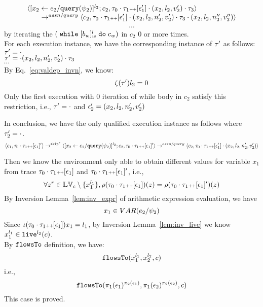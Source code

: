 \begin{subproof}
\begin{subproof}[Subproof]
\begin{enumerate}
\[\begin{array}{l}
  \langle [\mathrel{ {x}_2 \leftarrow e_2 / {\tt query}(\psi_2) }]^{l_2} ; {c}_2, 
  \mathtt{\tau}_0 \cdot \mathtt{\tau}_1 {\scriptscriptstyle ++} [\mathtt{\epsilon}_1']\cdot (x_2, l_2, v_2') \cdot \mathtt{\tau}_3 \rangle 
  \\ \qquad
  \rightarrow^{assn/query} 
  \langle {c}_2,  \mathtt{\tau}_0 \cdot \mathtt{\tau}_1 {\scriptscriptstyle ++} [\mathtt{\epsilon}_1']\cdot (x_2, l_2, n_2', v_2') \cdot \mathtt{\tau}_3 \cdot (x_2, l_2, n_2'', v_2'') \rangle 
 \end{array}
 \]
\[
  \cdots
\] 
by iterating the $(\;\mathtt{while}\; [b_w]^l_w \;\mathtt{do}\; c_w)$ in $c_2$ $0$ or more times.
%
\\
%
For each execution instance, we have the corresponding instance of $\mathtt{\tau}'$ as follows:
\\
$\mathtt{\tau}'  = \cdot$
\\
$\mathtt{\tau}' = \cdot (x_2, l_2, n_2', v_2') \cdot \mathtt{\tau}_3 $
%
\\
$\cdots$
%
\\
%
By Eq.~\ref{eq:valdep_invn}, we know:
%
\[
 \mathtt{\zeta}(\mathtt{\tau}') l_2 = 0
\]
%
Only the first execution with 0 iteration of while body in $c_2$ satisfy this restriction, i.e., $\mathtt{\tau}' = \cdot$ and $\mathtt{\epsilon}_2' = (x_2, l_2, n_2', v_2')$
%
\end{enumerate}
In conclusion, we have the only qualified execution instance as follows where $\mathtt{\tau}_2' = \cdot$.
  \[
  \langle c_1, \mathtt{\tau}_0 \cdot \mathtt{\tau}_1 {\scriptscriptstyle ++} [\mathtt{\epsilon}_1]' \rangle 
  \rightarrow^{\mathtt{skip}^*} 
  \langle [\mathrel{ {x}_2 \leftarrow e_2 / {\tt query}(\psi_2) }]^{l_2} ; {c}_2, \mathtt{\tau}_0 \cdot \mathtt{\tau}_1 {\scriptscriptstyle ++} [\mathtt{\epsilon}_1]' \rangle 
  \rightarrow^{assn/query} 
  \langle {c}_2,  \mathtt{\tau}_0 \cdot \mathtt{\tau}_1 {\scriptscriptstyle ++} [\mathtt{\epsilon}_1']\cdot (x_2, l_2, n_2', v_2') \rangle 
 \]
\end{subproof}
%
Then we know the environment only able to obtain different values for variable $x_1$ 
from trace $\mathtt{\tau}_0 \cdot \mathtt{\tau}_1 {\scriptscriptstyle ++} [\mathtt{\epsilon}_1]$ and 
$\mathtt{\tau}_0 \cdot \mathtt{\tau}_1 {\scriptscriptstyle ++} [\mathtt{\epsilon}_1]'$, i.e.,
\[
  \forall z^r \in \mathbb{LV}_c \setminus \{x_1^{l_1}\} ,
  \rho(\mathtt{\tau}_0 \cdot \mathtt{\tau}_1 {\scriptscriptstyle ++} [\mathtt{\epsilon}_1]) (z) =  
  \rho(\mathtt{\tau}_0 \cdot \mathtt{\tau}_1 {\scriptscriptstyle ++} [\mathtt{\epsilon}_1]') (z)
\]
%
By {Inversion Lemma~\ref{lem:inv_expr}} of arithmetic expression evaluation, we have
\[
  x_1 \in VAR(e_2 / \psi_2) 
\]
Since $\iota(\mathtt{\tau}_0 \cdot \mathtt{\tau}_1 {\scriptscriptstyle ++} [\mathtt{\epsilon}_1]) x_1 = l_1$, by Inversion Lemma~\ref{lem:inv_live} we know $x_1^{l_1} \in \mathtt{live}^{l_2}(c)$.
%
\\
%
By $\mathtt{flowsTo}$ definition, we have:
%
\[
\mathtt{flowsTo}(x_1^{l_1}, {x}_2^{l_2}, c)
\]
i.e.,
%
\[
\mathtt{flowsTo}(\pi_1(\mathtt{\epsilon}_1)^{\pi_2(\mathtt{\epsilon}_1)}, \pi_1(\mathtt{\epsilon}_2)^{\pi_2(\mathtt{\epsilon}_2)}, c)
 \]
%
This case is proved.
\end{subproof}